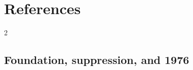 \section{References}

\begingroup
\setlength{\parskip}{0.15em}
\titlespacing*{\subsection}{0pt}{1.35ex}{0.45ex}
\begin{multicols}{2}
\raggedcolumns

\subsection*{Foundation, suppression, and 1976}


\end{multicols}

